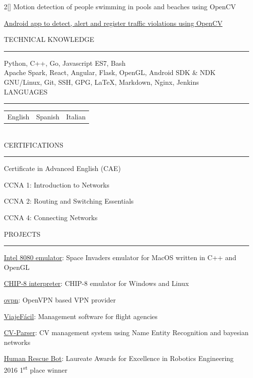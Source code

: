 \documentclass[a4paper, 12pt]{article}
\newenvironment{myparacol}[2][]{%
\begin{paracol}{#2}[#1]\setlength{\parindent}{0pt}}{%
\end{paracol}}
\begin{document}
\begin{sloppypar}
\begin{myparacol}{2}
    Motion detection of people swimming in pools and beaches using OpenCV

    \href{https://github.com/hugo19941994/infrac-coche}{Android app to detect, alert and register traffic violations using OpenCV}
    \\

    \switchcolumn

    TECHNICAL KNOWLEDGE
    \vspace{1mm}
    \hrule
    \kern9pt

    Python, C++, Go, Javascript ES7, Bash\\

    Apache Spark, React, Angular, Flask, OpenGL, Android SDK \& NDK\\

    GNU/Linux, Git, SSH, GPG, \LaTeX, Markdown, Nginx, Jenkins\\

    LANGUAGES
    \vspace{1mm}
    \hrule
    \kern9pt
    \noindent\begin{tabularx}{\columnwidth}{ @{} X X X }
        English & Spanish & Italian
    \end{tabularx}
    \\

    CERTIFICATIONS
    \vspace{1mm}
    \hrule
    \kern9pt
    Certificate in Advanced English (CAE)

    CCNA 1: Introduction to Networks

    CCNA 2: Routing and Switching Essentials

    CCNA 4: Connecting Networks

    \switchcolumn

    \noindent PROJECTS
    \vspace{1mm}
    \hrule
    \kern9pt
    \href{https://github.com/hugo19941994/SpaceInvaders-Emu}{Intel 8080 emulator}: Space Invaders emulator for MacOS written in C++ and OpenGL

    \href{https://github.com/hugo19941994/CHIP8-Emu}{CHIP-8 interpreter}: CHIP-8 emulator for Windows and Linux

    \href{https://vpn.hugofs.com}{ovpn}: OpenVPN based VPN provider

    \href{https://github.com/hugo19941994/ViajeFacil}{ViajeFácil}: Management software for flight agencies

    \href{https://github.com/hugo19941994/CV-Parser}{CV-Parser}: CV management system using Name Entity Recognition and bayesian networks

    \href{https://github.com/hugo19941994/robot}{Human Rescue Bot}: Laureate Awards for Excellence in Robotics Engineering 2016 1\textsuperscript{st} place winner

\end{myparacol}
\end{sloppypar}
\end{document}
